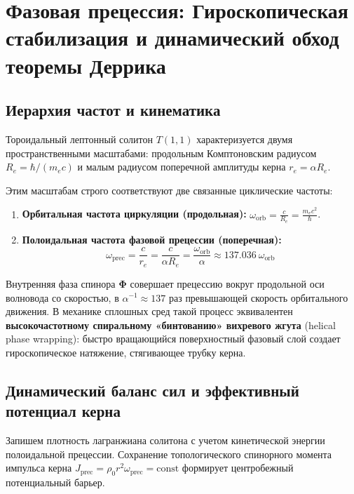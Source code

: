 \documentclass[12pt,a4paper]{article}
\begin{document}
	\section{Фазовая прецессия: Гироскопическая стабилизация и динамический обход теоремы Деррика}
	
	\subsection{Иерархия частот и кинематика}
	Тороидальный лептонный солитон $T(1,1)$ характеризуется двумя пространственными масштабами: продольным Комптоновским радиусом $R_e = \hbar / (m_e c)$ и малым радиусом поперечной амплитуды керна $r_e = \alpha R_e$.
	
	Этим масштабам строго соответствуют две связанные циклические частоты:
	\begin{enumerate}
		\item \textbf{Орбитальная частота циркуляции (продольная):} $\omega_{\text{orb}} = \frac{c}{R_e} = \frac{m_e c^2}{\hbar}$.
		\item \textbf{Полоидальная частота фазовой прецессии (поперечная):} 
		\begin{equation}
			\omega_{\text{prec}} = \frac{c}{r_e} = \frac{c}{\alpha R_e} = \frac{\omega_{\text{orb}}}{\alpha} \approx 137.036 \ \omega_{\text{orb}}
		\end{equation}
	\end{enumerate}
	
	Внутренняя фаза спинора $\boldsymbol{\Phi}$ совершает прецессию вокруг продольной оси волновода со скоростью, в $\alpha^{-1} \approx 137$ раз превышающей скорость орбитального движения. 
	В механике сплошных сред такой процесс эквивалентен \textbf{высокочастотному спиральному «бинтованию» вихревого жгута} (helical phase wrapping): быстро вращающийся поверхностный фазовый слой создает гироскопическое натяжение, стягивающее трубку керна.
	
	\subsection{Динамический баланс сил и эффективный потенциал керна}
	Запишем плотность лагранжиана солитона с учетом кинетической энергии полоидальной прецессии. Сохранение топологического спинорного момента импульса керна $J_{\text{prec}} = \rho_0 r^2 \omega_{\text{prec}} = \text{const}$ формирует центробежный потенциальный барьер.
	
\end{document}
